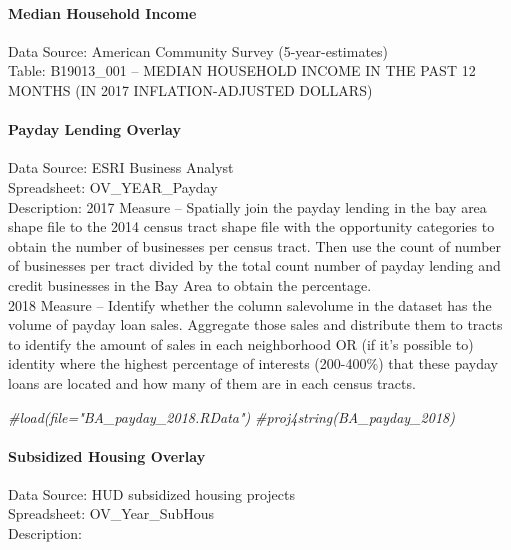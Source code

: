\documentclass[]{article}
\newenvironment{Shaded}{\begin{snugshade}}{\end{snugshade}}
\newcommand{\CommentTok}[1]{\textcolor[rgb]{0.56,0.35,0.01}{\textit{#1}}}
\let\oldparagraph\paragraph
\renewcommand{\paragraph}[1]{\oldparagraph{#1}\mbox{}}
\begin{document}
\paragraph{Median Household Income}\label{median-household-income}

Data Source: American Community Survey (5-year-estimates)\\
Table: B19013\_001 -- MEDIAN HOUSEHOLD INCOME IN THE PAST 12 MONTHS (IN
2017 INFLATION-ADJUSTED DOLLARS)

\paragraph{Payday Lending Overlay}\label{payday-lending-overlay}

Data Source: ESRI Business Analyst\\
Spreadsheet: OV\_YEAR\_Payday\\
Description: 2017 Measure -- Spatially join the payday lending in the
bay area shape file to the 2014 census tract shape file with the
opportunity categories to obtain the number of businesses per census
tract. Then use the count of number of businesses per tract divided by
the total count number of payday lending and credit businesses in the
Bay Area to obtain the percentage.\\
2018 Measure -- Identify whether the column salevolume in the dataset
has the volume of payday loan sales. Aggregate those sales and
distribute them to tracts to identify the amount of sales in each
neighborhood OR (if it's possible to) identity where the highest
percentage of interests (200-400\%) that these payday loans are located
and how many of them are in each census tracts.

\begin{Shaded}
\begin{Highlighting}[]
\CommentTok{#load(file="BA_payday_2018.RData")}
\CommentTok{#proj4string(BA_payday_2018)}
\end{Highlighting}
\end{Shaded}

\paragraph{Subsidized Housing Overlay}\label{subsidized-housing-overlay}

Data Source: HUD subsidized housing projects\\
Spreadsheet: OV\_Year\_SubHous\\
Description:
\end{document}
